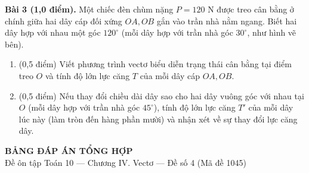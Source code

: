 \documentclass[10pt,a4paper]{article}
\begin{document}
\vspace{6pt}
\textbf{Bài 3 (1,0 điểm).} Một chiếc đèn chùm nặng $P = 120\text{ N}$ được treo cân bằng ở chính giữa hai dây cáp đối xứng $OA, OB$ gắn vào trần nhà nằm ngang. Biết hai dây hợp với nhau một góc $120^\circ$ (mỗi dây hợp với trần nhà góc $30^\circ$, như hình vẽ bên).
\par\noindent\begin{minipage}[t]{0.68\linewidth}
\begin{enumerate}[label=\alph*), leftmargin=0.6cm, itemsep=2pt]
    \item (0,5 điểm) Viết phương trình vectơ biểu diễn trạng thái cân bằng tại điểm treo $O$ và tính độ lớn lực căng $T$ của mỗi dây cáp $OA, OB$.
    \item (0,5 điểm) Nếu thay đổi chiều dài dây sao cho hai dây vuông góc với nhau tại $O$ (mỗi dây hợp với trần nhà góc $45^\circ$), tính độ lớn lực căng $T'$ của mỗi dây lúc này (làm tròn đến hàng phần mười) và nhận xét về sự thay đổi lực căng dây.
\end{enumerate}
\end{minipage}\hfill
\begin{minipage}[t]{0.30\linewidth}\raggedleft\vspace{-12pt}
\end{minipage}


\newpage
\pagestyle{dapan}
\setcounter{page}{1}

\begin{center}
  {\Large\bfseries\color{ink} BẢNG ĐÁP ÁN TỔNG HỢP}\\[2pt]
  {\small\color{gray!75!black} Đề ôn tập Toán 10 — Chương IV. Vectơ — Đề số 4 (Mã đề 1045)}
\end{center}
\vspace{1pt}
\end{document}

